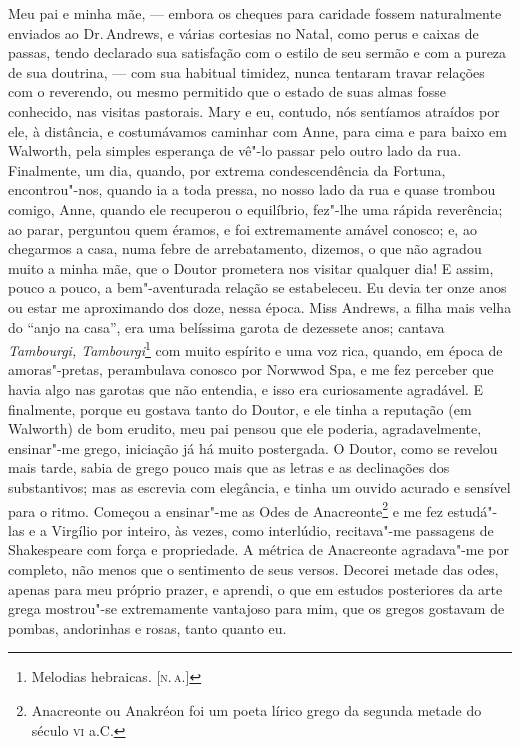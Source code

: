 Meu pai e minha mãe, --- embora os cheques para caridade fossem
naturalmente enviados ao Dr.\,Andrews, e várias cortesias no Natal, como
perus e caixas de passas, tendo declarado sua satisfação com o estilo de
seu sermão e com a pureza de sua doutrina, --- com sua habitual timidez,
nunca tentaram travar relações com o reverendo, ou mesmo permitido que o
estado de suas almas fosse conhecido, nas visitas pastorais. Mary e eu,
contudo, nós sentíamos atraídos por ele, à distância, e costumávamos
caminhar com Anne, para cima e para baixo em Walworth, pela simples
esperança de vê"-lo passar pelo outro lado da rua. Finalmente, um dia,
quando, por extrema condescendência da Fortuna, encontrou"-nos, quando ia
a toda pressa, no nosso lado da rua e quase trombou comigo, Anne, quando
ele recuperou o equilíbrio, fez"-lhe uma rápida reverência; ao parar,
perguntou quem éramos, e foi extremamente amável conosco; e, ao
chegarmos a casa, numa febre de arrebatamento, dizemos, o que não
agradou muito a minha mãe, que o Doutor prometera nos visitar qualquer
dia! E assim, pouco a pouco, a bem"-aventurada relação se estabeleceu. Eu
devia ter onze anos ou estar me aproximando dos doze, nessa época. Miss
Andrews, a filha mais velha do ``anjo na casa'', era uma belíssima
garota de dezessete anos; cantava \textit{Tambourgi, Tambourgi}\footnote{Melodias
  hebraicas. {[}\textsc{n.\,a.}{]}} com muito espírito e uma voz rica, quando,
em época de amoras"-pretas, perambulava conosco por Norwwod Spa, e me fez
perceber que havia algo nas garotas que não entendia, e isso era
curiosamente agradável. E finalmente, porque eu gostava tanto do Doutor,
e ele tinha a reputação (em Walworth) de bom erudito, meu pai pensou que
ele poderia, agradavelmente, ensinar"-me grego, iniciação já há muito
postergada. O Doutor, como se revelou mais tarde, sabia de grego pouco
mais que as letras e as declinações dos substantivos; mas as escrevia
com elegância, e tinha um ouvido acurado e sensível para o ritmo.
Começou a ensinar"-me as Odes de Anacreonte\footnote{Anacreonte ou Anakréon foi um poeta
  lírico grego da segunda metade do século \textsc{vi} a.C.} e me
fez estudá"-las e a Virgílio por inteiro, às vezes, como interlúdio,
recitava"-me passagens de Shakespeare com força e propriedade. A métrica
de Anacreonte agradava"-me por completo, não menos que o sentimento de
seus versos. Decorei metade das odes, apenas para meu próprio prazer, e
aprendi, o que em estudos posteriores da arte grega mostrou"-se
extremamente vantajoso para mim, que os gregos gostavam de pombas,
andorinhas e rosas, tanto quanto eu.

